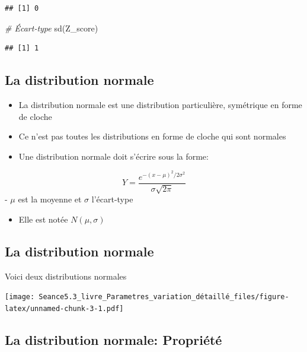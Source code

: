 \documentclass[
]{article}
\newenvironment{Shaded}{\begin{snugshade}}{\end{snugshade}}
\newcommand{\CommentTok}[1]{\textcolor[rgb]{0.56,0.35,0.01}{\textit{#1}}}
\newcommand{\FunctionTok}[1]{\textcolor[rgb]{0.00,0.00,0.00}{#1}}
\newcommand{\NormalTok}[1]{#1}
\providecommand{\tightlist}{%
  \setlength{\itemsep}{0pt}\setlength{\parskip}{0pt}}
\begin{document}
\begin{verbatim}
## [1] 0
\end{verbatim}

\begin{Shaded}
\begin{Highlighting}[]
\CommentTok{\# Écart{-}type}
\FunctionTok{sd}\NormalTok{(Z\_score)}
\end{Highlighting}
\end{Shaded}

\begin{verbatim}
## [1] 1
\end{verbatim}

\hypertarget{la-distribution-normale}{%
\subsection{La distribution normale}\label{la-distribution-normale}}

\begin{itemize}
\tightlist
\item
  La distribution normale est une distribution particulière, symétrique
  en forme de cloche
\item
  Ce n'est pas toutes les distributions en forme de cloche qui sont
  normales
\item
  Une distribution normale doit s'écrire sous la forme:
\end{itemize}

\[Y = \frac{e^{-(x - \mu)^2/2\sigma^2}}{\sigma\sqrt{2\pi}}\] - \(\mu\)
est la moyenne et \(\sigma\) l'écart-type

\begin{itemize}
\tightlist
\item
  Elle est notée \(N(\mu, \sigma)\)
\end{itemize}

\hypertarget{la-distribution-normale-1}{%
\subsection{La distribution normale}\label{la-distribution-normale-1}}

Voici deux distributions normales

\texttt{[image: Seance5.3\_livre\_Parametres\_variation\_détaillé\_files/figure-latex/unnamed-chunk-3-1.pdf]}

\hypertarget{la-distribution-normale-propriuxe9tuxe9}{%
\subsection{La distribution normale:
Propriété}\label{la-distribution-normale-propriuxe9tuxe9}}
\end{document}
